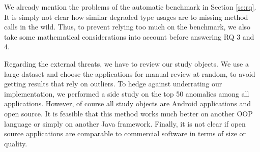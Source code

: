 We already mention the problems of the automatic benchmark in Section \ref{sc:rq}.
It is simply not clear how similar degraded type usages are to missing method calls in the wild.
Thus, to prevent relying too much on the benchmark, we also take some mathematical considerations into account before answering RQ 3 and 4.

Regarding the external threats, we have to review our study objects.
We use a large dataset and choose the applications for manual review at random, to avoid getting results that rely on outliers.
To hedge against underrating our implementation, we performed a side study on the top 50 anomalies among all applications.
However, of course all study objects are Android applications and open source.
It is feasible that this method works much better on another OOP language or simply on another Java framework.
Finally, it is not clear if open source applications are comparable to commercial software in terms of size or quality.

